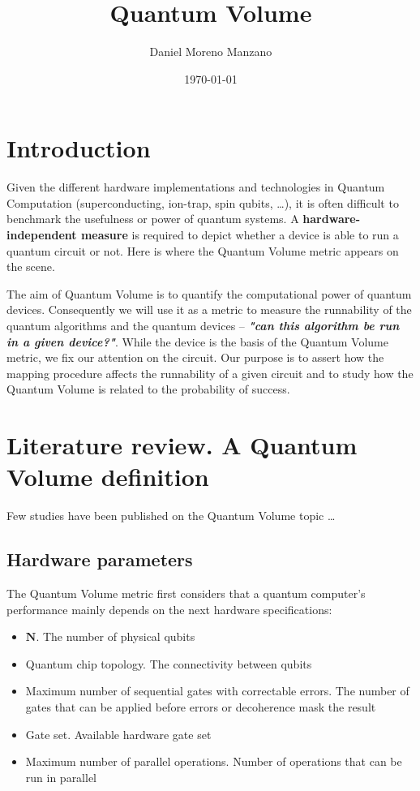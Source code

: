 \documentclass[11pt]{article}
\author{Daniel Moreno Manzano}
\date{\today}
\title{Quantum Volume}
\begin{document}
\maketitle


\section{Introduction}
\label{sec:org9cbdadc}

Given the different hardware implementations and technologies in Quantum Computation (superconducting, ion-trap, spin qubits, \ldots{}), it is often difficult to benchmark the usefulness or power of quantum systems. 
A \textbf{hardware-independent measure} is required to depict whether a device is able to run a quantum circuit or not.
Here is where the Quantum Volume metric appears on the scene.

The aim of Quantum Volume is to quantify the computational power of quantum devices. 
Consequently we will use it as a metric to measure the runnability of the quantum algorithms and the quantum devices -- \emph{\textbf{"can this algorithm be run in a given device?"}}.
While the device is the basis of the Quantum Volume metric, we fix our attention on the circuit.
Our purpose is to assert how the mapping procedure affects the runnability of a given circuit and to study how the Quantum Volume is related to the probability of success.

\section{Literature review. A Quantum Volume definition}
\label{sec:orga26a2c6}

Few studies have been published on the Quantum Volume topic \cite{Bishop_2017,Moll_2018}\ldots{}

\subsection{Hardware parameters}
\label{sec:org807b1ef}

The Quantum Volume metric first considers that a quantum computer's performance mainly depends on the next hardware specifications:

\begin{itemize}
\item \(\textbf{N}\). The number of physical qubits
\item Quantum chip topology. The connectivity between qubits
\item Maximum number of sequential gates with correctable errors. The number of gates that can be applied before errors or decoherence mask the result
\item Gate set. Available hardware gate set
\item Maximum number of parallel operations. Number of operations that can be run in parallel
\end{itemize}
\end{document}

